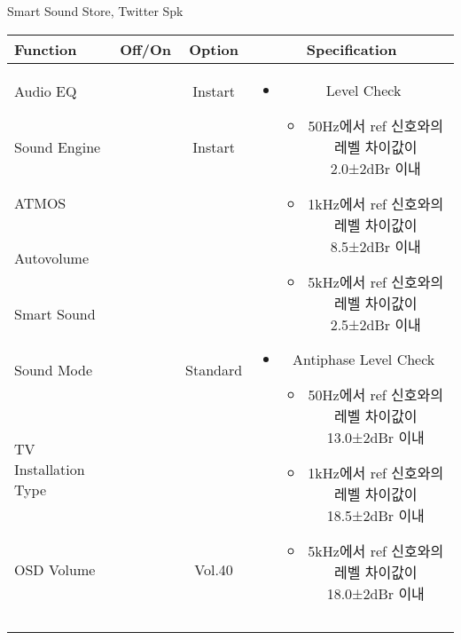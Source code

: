 \begin{frame}[t]{Smart Sound Store, Twitter Spk}
\begin{tiny}
\begin{tabular}{@{}lccc@{}}
\toprule
Function & Off/On & Option & Specification \\
\midrule
Audio EQ & \color{black}{Off} & Instart &
\multirow{10}{60mm}{
\begin{itemize}
	\item Level Check
	\begin{itemize}
		\item 50Hz에서 ref 신호와의 레벨 차이값이 2.0±2dBr 이내
		\item 1kHz에서 ref 신호와의 레벨 차이값이 8.5±2dBr 이내
		\item 5kHz에서 ref 신호와의 레벨 차이값이 2.5±2dBr 이내
	\end{itemize}
	\item Antiphase Level Check
	\begin{itemize}
		\item 50Hz에서 ref 신호와의 레벨 차이값이 13.0±2dBr 이내
		\item 1kHz에서 ref 신호와의 레벨 차이값이 18.5±2dBr 이내
		\item 5kHz에서 ref 신호와의 레벨 차이값이 18.0±2dBr 이내
	\end{itemize}
\end{itemize}
} \\
Sound Engine & \color{blue}{On} & Instart & \\
ATMOS & \color{black}{Off}  & & \\
Autovolume & \color{black}{Off} & & \\
Smart Sound & \color{blue}{On} & & \\
Sound Mode & \color{blue}{On} & Standard & \\
TV Installation Type & \color{blue}{On} & \color{black}{Standtype1} & \\
OSD Volume & \color{blue}{On} & Vol.40 & \\
& & & \\
& & & \\
& & & \\
& & & \\
\midrule
\end{tabular}
\end{tiny}

\end{frame}